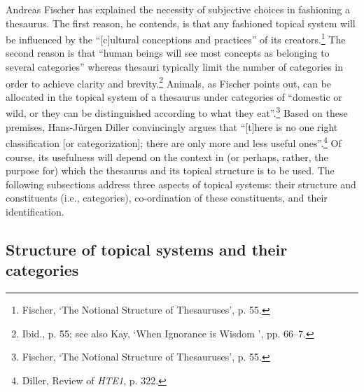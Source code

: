 Andreas Fischer has explained the necessity of subjective choices in fashioning a thesaurus. The first reason, he contends, is that any fashioned topical system will be influenced by the ``[c]ultural conceptions and practices'' of its creators.\footnote{Fischer, `The Notional Structure of Thesauruses', %
p. 55.} The second reason is that ``human beings will see most concepts as belonging to several categories'' whereas thesauri typically limit the number of categories in order to achieve clarity and brevity.\footnote{Ibid., %
p. 55; see also Kay, `When Ignorance is Wisdom%
', %
pp. 66–7.} 
Animals, as Fischer points out, can be allocated in the topical system of a thesaurus under categories of ``domestic or wild, or they can be distinguished according to what they eat''.\footnote{Fischer, `The Notional Structure of Thesauruses', p. 55.} 
Based on these premises, Hans-Jürgen Diller convincingly argues that ``[t]here is no one right classification [or categorization]; there are only more and less useful ones''.\footnote{Diller, Review of \textit{HTE1}, p. 322.} Of course, its usefulness will depend on the context in (or perhaps, rather, the purpose for) which the thesaurus and its topical structure is to be used. The following subsections address three aspects of topical systems: their structure and constituents (i.e., categories), co-ordination of these constituents, and their identification.

\subsection{Structure of topical systems and their categories}


